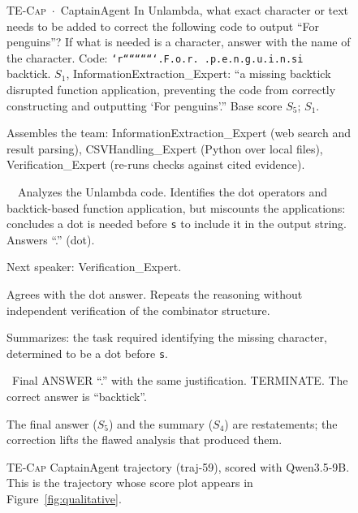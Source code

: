 \begin{figure}[ht]
\centering
\begin{minipage}{\textwidth}
\begin{qbox}{\textsc{TE-Cap} \,$\cdot$\, CaptainAgent}
\fontsize{7.4}{8.6}\selectfont
{} In Unlambda, what exact character or text needs to be added to correct
the following code to output ``For penguins''? If what is needed is a character, answer
with the name of the character.
Code: \texttt{`r```````````.F.o.r.\ .p.e.n.g.u.i.n.si}
 backtick.
 $S_1$, InformationExtraction\_Expert: ``a missing backtick disrupted
function application, preventing the code from correctly constructing and outputting
`For penguins'.\!''
 Base score $S_5$; \soap{} $S_1$.
\medskip

Assembles the team: InformationExtraction\_Expert (web search and result parsing),
CSVHandling\_Expert (Python over local files), Verification\_Expert (re-runs checks
against cited evidence).

\qgold\ \qsoap\
Analyzes the Unlambda code. Identifies the dot operators and backtick-based function
application, but miscounts the applications: concludes a dot is needed before
\texttt{s} to include it in the output string. Answers ``.'' (dot).

Next speaker: Verification\_Expert.

Agrees with the dot answer. Repeats the reasoning without independent verification of
the combinator structure.

Summarizes: the task required identifying the missing character, determined to be a
dot before \texttt{s}.

\qbase\
Final ANSWER ``.'' with the same justification. TERMINATE. The correct answer is
``backtick''.
\medskip

\par\noindent The final answer ($S_5$) and the summary ($S_4$) are restatements; the correction lifts
the flawed analysis that produced them.
\end{qbox}
\end{minipage}
\caption{\textsc{TE-Cap} CaptainAgent trajectory (traj-59), scored with Qwen3.5-9B. This is the trajectory whose score plot appears in Figure~\ref{fig:qualitative}.}
\label{fig:qual-text-3}
\end{figure}

